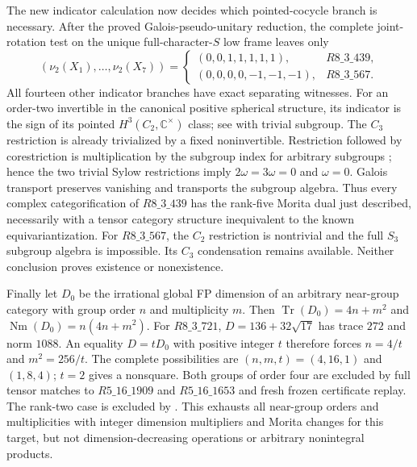 The new indicator calculation now decides which pointed-cocycle branch
is necessary. After the proved Galois-pseudo-unitary reduction, the
complete joint-rotation test on the unique full-character-$S$ low frame
leaves only
\[
 (\nu_2(X_1),\ldots,\nu_2(X_7))=
 \begin{cases}
 (0,0,1,1,1,1,1),&R8\_3\_439,\\
 (0,0,0,0,-1,-1,-1),&R8\_3\_567.
 \end{cases}
\]
All fourteen other indicator branches have exact separating witnesses.
For an order-two invertible in the canonical positive spherical
structure, its indicator is the sign of its pointed $H^3(C_2,\mathbb
C^\times)$ class; see \cite[Definition~2.2 and Proposition~4.1]{SchauenburgPointedFrontier}
with trivial subgroup. The $C_3$ restriction is already trivialized by
a fixed noninvertible. Restriction followed by corestriction is
multiplication by the subgroup index for arbitrary subgroups
\cite[Section~3.3, equation~(3.12)]{BrownTransferFrontier}; hence the
two trivial Sylow restrictions imply $2\omega=3\omega=0$ and
$\omega=0$. Galois transport preserves vanishing and transports the
subgroup algebra. Thus every complex categorification of $R8\_3\_439$
has the rank-five Morita dual just described, necessarily with a tensor
category structure inequivalent to the known equivariantization.
For $R8\_3\_567$, the $C_2$ restriction is nontrivial and the full
$S_3$ subgroup algebra is impossible. Its $C_3$ condensation remains
available. Neither conclusion proves existence or nonexistence.

Finally let $D_0$ be the irrational global FP dimension of an arbitrary
near-group category with group order $n$ and multiplicity $m$. Then
$\operatorname{Tr}(D_0)=4n+m^2$ and
$\operatorname{Nm}(D_0)=n(4n+m^2)$. For $R8\_3\_721$,
$D=136+32\sqrt{17}$ has trace $272$ and norm $1088$.
An equality $D=tD_0$ with positive integer $t$ therefore forces
$n=4/t$ and $m^2=256/t$. The complete possibilities are
$(n,m,t)=(4,16,1)$ and $(1,8,4)$; $t=2$ gives a nonsquare.
Both groups of order four are excluded by full tensor matches to
$R5\_16\_1909$ and $R5\_16\_1653$ and fresh frozen
certificate replay. The rank-two case is excluded by
\cite[Main Theorem]{Ostrik2}.
This exhausts all near-group orders and multiplicities with integer
dimension multipliers and Morita changes for this target, but not
dimension-decreasing operations or arbitrary nonintegral products.
